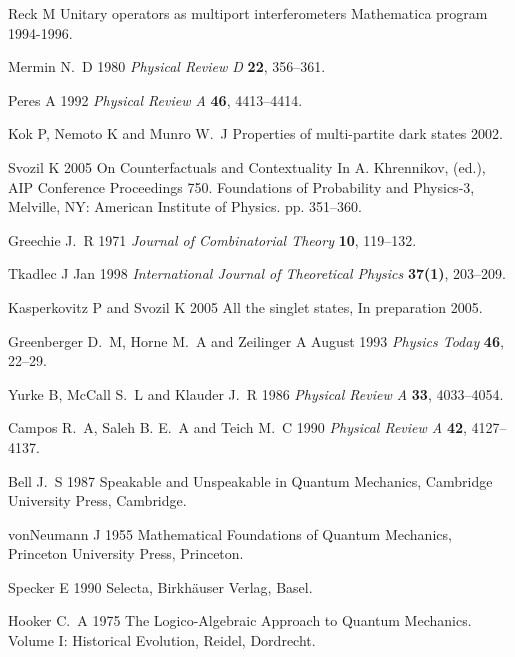 \documentclass[12pt]{iopart}
\begin{document}
\begin{thebibliography}{10}
Reck M
Unitary operators as multiport interferometers
Mathematica program 1994-1996.

Mermin N.~D 1980
{\em Physical Review D} {\bf 22}, 356--361.

Peres A 1992
{\em Physical Review A} {\bf 46}, 4413--4414.

Kok P, Nemoto K  and Munro W.~J
Properties of multi-partite dark states
2002.

Svozil K 2005
On Counterfactuals and Contextuality
In A. Khrennikov, (ed.), AIP Conference Proceedings 750. {F}oundations of Probability and Physics-3,
Melville, NY: American Institute of Physics.
pp. 351--360.

Greechie J.~R 1971
{\em Journal of Combinatorial Theory} {\bf 10}, 119--132.

Tkadlec J Jan 1998
{\em International Journal of Theoretical Physics} {\bf 37(1)}, 203--209.

Kasperkovitz P and Svozil K 2005
All the singlet states,
In preparation 2005.

Greenberger D.~M, Horne M.~A  and Zeilinger A August 1993
{\em Physics Today} {\bf 46}, 22--29.

Yurke B, McCall S.~L  and Klauder J.~R 1986
{\em Physical Review A} {\bf 33}, 4033--4054.

Campos R.~A, Saleh B. E.~A  and Teich M.~C 1990
{\em Physical Review A} {\bf 42}, 4127--4137.

Bell J.~S 1987
Speakable and Unspeakable in Quantum Mechanics,
Cambridge University Press, Cambridge.

vonNeumann J 1955
Mathematical Foundations of Quantum Mechanics,
Princeton University Press, Princeton.

Specker E 1990
Selecta,
Birkh{\"{a}}user Verlag, Basel.

Hooker C.~A 1975
The Logico-Algebraic Approach to Quantum Mechanics. {V}olume {I}: Historical
  Evolution,
Reidel, Dordrecht.

\end{thebibliography}
\end{document}

